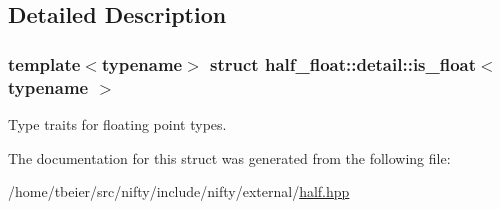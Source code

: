 \subsection{Detailed Description}
\subsubsection*{template$<$typename$>$\newline
struct half\+\_\+float\+::detail\+::is\+\_\+float$<$ typename $>$}

Type traits for floating point types. 

The documentation for this struct was generated from the following file\+:\begin{DoxyCompactItemize}
\item 
/home/tbeier/src/nifty/include/nifty/external/\hyperlink{half_8hpp}{half.\+hpp}\end{DoxyCompactItemize}
